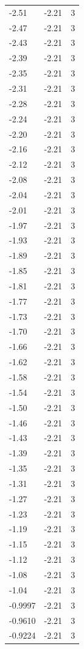 \begin{longtable}{lrr}
  -2.51 & -2.21 & 3 \\
  -2.47 & -2.21 & 3 \\
  -2.43 & -2.21 & 3 \\
  -2.39 & -2.21 & 3 \\
  -2.35 & -2.21 & 3 \\
  -2.31 & -2.21 & 3 \\
  -2.28 & -2.21 & 3 \\
  -2.24 & -2.21 & 3 \\
  -2.20 & -2.21 & 3 \\
  -2.16 & -2.21 & 3 \\
  -2.12 & -2.21 & 3 \\
  -2.08 & -2.21 & 3 \\
  -2.04 & -2.21 & 3 \\
  -2.01 & -2.21 & 3 \\
  -1.97 & -2.21 & 3 \\
  -1.93 & -2.21 & 3 \\
  -1.89 & -2.21 & 3 \\
  -1.85 & -2.21 & 3 \\
  -1.81 & -2.21 & 3 \\
  -1.77 & -2.21 & 3 \\
  -1.73 & -2.21 & 3 \\
  -1.70 & -2.21 & 3 \\
  -1.66 & -2.21 & 3 \\
  -1.62 & -2.21 & 3 \\
  -1.58 & -2.21 & 3 \\
  -1.54 & -2.21 & 3 \\
  -1.50 & -2.21 & 3 \\
  -1.46 & -2.21 & 3 \\
  -1.43 & -2.21 & 3 \\
  -1.39 & -2.21 & 3 \\
  -1.35 & -2.21 & 3 \\
  -1.31 & -2.21 & 3 \\
  -1.27 & -2.21 & 3 \\
  -1.23 & -2.21 & 3 \\
  -1.19 & -2.21 & 3 \\
  -1.15 & -2.21 & 3 \\
  -1.12 & -2.21 & 3 \\
  -1.08 & -2.21 & 3 \\
  -1.04 & -2.21 & 3 \\
  -0.9997 & -2.21 & 3 \\
  -0.9610 & -2.21 & 3 \\
  -0.9224 & -2.21 & 3 \\

\end{longtable}

